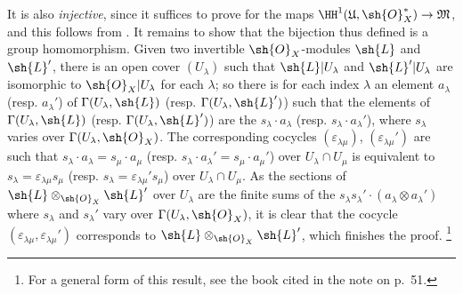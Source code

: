 \begin{env}[5.4.7]
It is also \emph{injective}, since it suffices to prove for the maps $\HH^1(\mathfrak{U},\sh{O}_X^*)\to\mathfrak{M}$, and this follows from .
It remains to show that
the bijection thus defined is a group homomorphism.
Given two invertible $\sh{O}_X$-modules $\sh{L}$ and $\sh{L}'$, there is an open cover $(U_\lambda)$ such that $\sh{L}|U_\lambda$ and $\sh{L}'|U_\lambda$ are isomorphic to $\sh{O}_X|U_\lambda$ for each $\lambda$;
so there is for each index $\lambda$ an element $a_\lambda$ (resp. $a_\lambda'$) of $\Gamma(U_\lambda,\sh{L})$ (resp. $\Gamma(U_\lambda,\sh{L}')$) such that the elements of $\Gamma(U_\lambda,\sh{L})$ (resp. $\Gamma(U_\lambda,\sh{L}')$) are the $s_\lambda\cdot a_\lambda$ (resp. $s_\lambda\cdot a_\lambda'$), where $s_\lambda$ varies over $\Gamma(U_\lambda,\sh{O}_X)$.
The corresponding cocycles $(\varepsilon_{\lambda\mu})$, $(\varepsilon_{\lambda\mu}')$ are such that $s_\lambda\cdot a_\lambda=s_\mu\cdot a_\mu$ (resp. $s_\lambda\cdot a_\lambda'=s_\mu\cdot a_\mu'$) over $U_\lambda\cap U_\mu$ is equivalent to $s_\lambda=\varepsilon_{\lambda\mu}s_\mu$ (resp. $s_\lambda=\varepsilon_{\lambda\mu}' s_\mu$) over $U_\lambda\cap U_\mu$.
As the sections of $\sh{L}\otimes_{\sh{O}_X}\sh{L}'$ over $U_\lambda$ are the finite sums of the $s_\lambda s_\lambda'\cdot(a_\lambda\otimes a_\lambda')$ where $s_\lambda$ and $s_\lambda'$ vary over $\Gamma(U_\lambda,\sh{O}_X)$, it is clear that the cocycle $(\varepsilon_{\lambda\mu},\varepsilon_{\lambda\mu}')$ corresponds to $\sh{L}\otimes_{\sh{O}_X}\sh{L}'$, which finishes the proof.
\footnote{For a general form of this result, see the book cited in the note on p.~51.}
\end{env}

